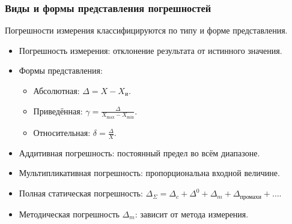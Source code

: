 	\subsubsection{Виды и формы представления погрешностей}
	Погрешности измерения классифицируются по типу и форме представления.
	\begin{itemize}
		\item Погрешность измерения: отклонение результата от истинного значения.
		\item Формы представления:
		\begin{itemize}
			\item Абсолютная: $\Delta = X - X_{\text{и}}$.
			\item Приведённая: $\gamma = \frac{\Delta}{X_{\text{max}} - X_{\text{min}}}$.
			\item Относительная: $\delta = \frac{\Delta}{X}$.
		\end{itemize}
		\item Аддитивная погрешность: постоянный предел во всём диапазоне.
		\item Мультипликативная погрешность: пропорциональна входной величине.
		\item Полная статическая погрешность: $\Delta_\Sigma = \Delta_c + \Delta^0 + \Delta_m + \Delta_{\text{промахи}} + \dots$.
		\item Методическая погрешность $\Delta_m$: зависит от метода измерения.
	\end{itemize}
	
	\newpage
	

